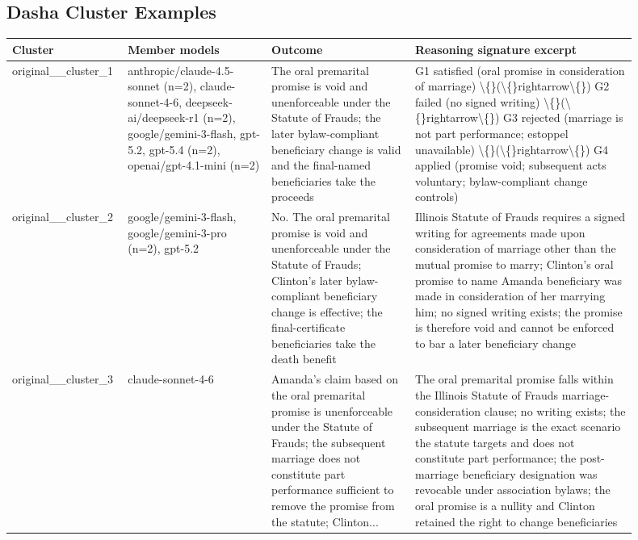 \subsection{Dasha Cluster Examples}

\begin{longtable}{p{0.12\linewidth}p{0.22\linewidth}p{0.22\linewidth}p{0.34\linewidth}}
\toprule
Cluster & Member models & Outcome & Reasoning signature excerpt \\
\midrule
original\_\_cluster\_1 & anthropic/claude-4.5-sonnet (n=2), claude-sonnet-4-6, deepseek-ai/deepseek-r1 (n=2), google/gemini-3-flash, gpt-5.2, gpt-5.4 (n=2), openai/gpt-4.1-mini (n=2) & The oral premarital promise is void and unenforceable under the Statute of Frauds; the later bylaw-compliant beneficiary change is valid and the final-named beneficiaries take the proceeds & G1 satisfied (oral promise in consideration of marriage) \textbackslash\{\}(\textbackslash\{\}rightarrow\textbackslash\{\}) G2 failed (no signed writing) \textbackslash\{\}(\textbackslash\{\}rightarrow\textbackslash\{\}) G3 rejected (marriage is not part performance; estoppel unavailable) \textbackslash\{\}(\textbackslash\{\}rightarrow\textbackslash\{\}) G4 applied (promise void; subsequent acts voluntary; bylaw-compliant change controls) \\
original\_\_cluster\_2 & google/gemini-3-flash, google/gemini-3-pro (n=2), gpt-5.2 & No. The oral premarital promise is void and unenforceable under the Statute of Frauds; Clinton's later bylaw-compliant beneficiary change is effective; the final-certificate beneficiaries take the death benefit & Illinois Statute of Frauds requires a signed writing for agreements made upon consideration of marriage other than the mutual promise to marry; Clinton's oral promise to name Amanda beneficiary was made in consideration of her marrying him; no signed writing exists; the promise is therefore void and cannot be enforced to bar a later beneficiary change \\
original\_\_cluster\_3 & claude-sonnet-4-6 & Amanda's claim based on the oral premarital promise is unenforceable under the Statute of Frauds; the subsequent marriage does not constitute part performance sufficient to remove the promise from the statute; Clinton... & The oral premarital promise falls within the Illinois Statute of Frauds marriage-consideration clause; no writing exists; the subsequent marriage is the exact scenario the statute targets and does not constitute part performance; the post-marriage beneficiary designation was revocable under association bylaws; the oral promise is a nullity and Clinton retained the right to change beneficiaries \\

\end{longtable}
